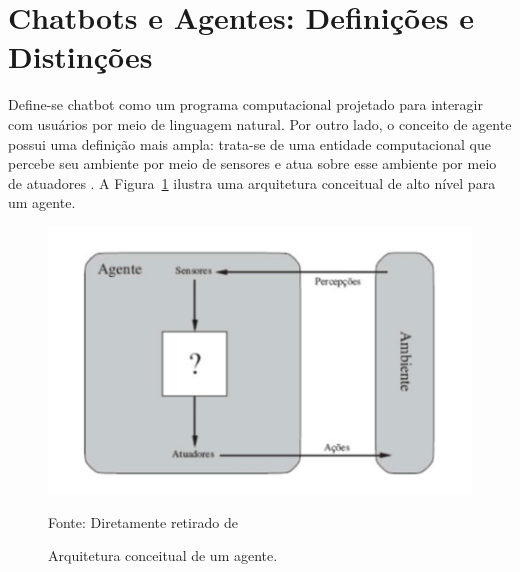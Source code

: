 \documentclass[a4paper,oneside]{book}
\begin{document}



\section{Chatbots e Agentes: Definições e Distinções}

Define-se chatbot como um programa computacional projetado para interagir com usuários por meio de linguagem natural. Por outro lado, o conceito de agente possui uma definição mais ampla: trata-se de uma entidade computacional que percebe seu ambiente por meio de sensores e atua sobre esse ambiente por meio de atuadores \cite{Russel2013}. A Figura~\ref{fig:agente} ilustra uma arquitetura conceitual de alto nível para um agente.

\begin{figure}
	\centering
	\caption{Arquitetura conceitual de um agente.}
	\includegraphics[width=0.7\linewidth]{fig/ia.png}
	\label{fig:agente}
	{\footnotesize \centering

		Fonte: Diretamente retirado de \cite{Russel2013}}
\end{figure}
\end{document}

